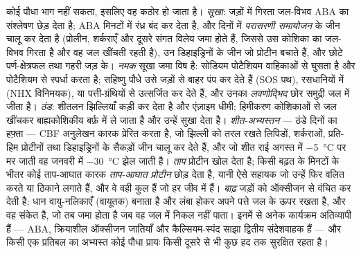 \begin{definition}[अजैविक प्रतिबल]\label{def:b3:plant-molecular-physiology:abiotic}
कोई पौधा भाग नहीं सकता, इसलिए वह कठोर हो जाता है। \emph{सूखा}: जड़ों
में गिरता जल-विभव ABA का संश्लेषण छेड़ देता है; ABA मिनटों में रंध्र बंद
कर देता है, और दिनों में \emph{परासरणी समायोजन} के जीन चालू कर देता है
(प्रोलीन, शर्कराएँ और दूसरे संगत विलेय जमा होते हैं, जिससे उस कोशिका
का जल-विभव गिरता है और वह जल खींचती रहती है), उन डिहाइड्रिनों के जीन
जो प्रोटीन बचाते हैं, और छोटे पर्ण-क्षेत्रफल तथा गहरी जड़ के।
\emph{नमक} सूखा जमा विष है: सोडियम पोटैशियम वाहिकाओं से घुसता है और
पोटैशियम से स्पर्धा करता है; सहिष्णु पौधे उसे जड़ों से बाहर पंप कर देते
हैं (SOS पथ), रसधानियों में (NHX विनिमयक), या पत्ती-ग्रंथियों से
उत्सर्जित कर देते हैं, और उनका \emph{लवणोद्भिद} छोर समुद्री जल में जीता
है। \emph{ठंड}: शीतलन झिल्लियाँ कड़ी कर देता है और एंज़ाइम धीमी;
हिमीकरण कोशिकाओं से जल खींचकर बाह्यकोशिकीय बर्फ़ में ले जाता है और
उन्हें सुखा देता है। \emph{शीत-अभ्यस्तन} --- ठंडे दिनों का हफ़्ता ---
CBF अनुलेखन कारक प्रेरित करता है, जो झिल्ली को तरल रखते लिपिडों,
शर्कराओं, प्रति-हिम प्रोटीनों तथा डिहाइड्रिनों के सैकड़ों जीन चालू कर
देते हैं, और जो शीत राई अगस्त में \qty{-5}{\celsius} पर मर जाती वह
जनवरी में \qty{-30}{\celsius} झेल जाती है। \emph{ताप} प्रोटीन खोल देता
है; किसी बढ़त के मिनटों के भीतर कोई ताप-आघात कारक \emph{ताप-आघात
प्रोटीन} छोड़ देता है, यानी ऐसे सहायक जो उन्हें फिर वलित करते या ठिकाने
लगाते हैं, और वे वही कुल हैं जो हर जीव में हैं। \emph{बाढ़} जड़ों को
ऑक्सीजन से वंचित कर देती है; धान वायु-नलिकाएँ (वायूतक) बनाता है और
लंबा होकर अपने पत्ते जल के ऊपर रखता है, और वह संकेत  है, जो तब
जमा होता है जब वह जल में निकल नहीं पाता। इनमें से अनेक कार्यक्रम
अतिव्यापी हैं --- ABA, क्रियाशील ऑक्सीजन जातियाँ और कैल्सियम-स्पंद साझा
द्वितीय संदेशवाहक हैं --- और किसी एक प्रतिबल का अभ्यस्त कोई पौधा प्रायः
किसी दूसरे से भी कुछ हद तक सुरक्षित रहता है।
\end{definition}

